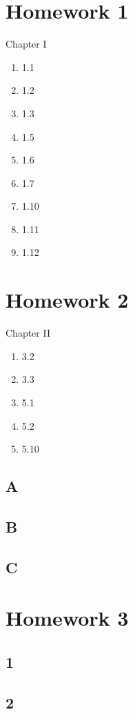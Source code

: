 \documentclass[12pt]{article}
\begin{document}
\section{Homework 1}

Chapter I
\begin{enumerate}
\item 1.1
\item 1.2
\item 1.3
\item 1.5
\item 1.6
\item 1.7
\item 1.10
\item 1.11
\item 1.12
\end{enumerate}

\section{Homework 2}

Chapter II
\begin{enumerate}
\item 3.2
\item 3.3
\item 5.1
\item 5.2
\item 5.10
\end{enumerate}

\subsection{A}

\subsection{B}

\subsection{C}

\section{Homework 3}

\subsection{1}

\subsection{2}
\end{document}
